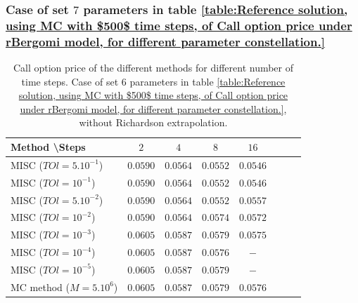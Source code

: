 \documentclass[11pt]{article}
\begin{document}
\subsubsection{Case of set $7$ parameters in table \ref{table:Reference solution, using MC with $500$ time steps, of Call option price under rBergomi model, for different parameter constellation.}}\label{sec:Case of set 7 parameters}

\begin{table}[h!]
	\centering
	\begin{tabular}{l*{6}{c}r}
		Method \textbackslash  Steps            & $2$ & $4$ & $8$ & $16$ &   \\
		\hline
		MISC ($TOl=5.10^{-1}$)  & $0.0590$ & $0.0564$ & $0.0552$ & $0.0546$  \\
		MISC ($TOl=10^{-1}$)  & $0.0590$ &$0.0564$& $0.0552$ & $0.0546$   \\
		MISC ($TOl=5.10^{-2}$)  &$0.0590$ & $0.0564$ & $0.0552$ & $0.0557$  \\
		MISC ($TOl=10^{-2}$)  &$0.0590$ &$0.0564$ & $0.0574$ & $0.0572$  \\
		
		MISC ($TOl=10^{-3}$)  & $0.0605$ & $0.0587$ & $0.0579$ & $0.0575$  \\
		MISC ($TOl=10^{-4}$)  &  $0.0605$ & $0.0587$ & $0.0576$ & $-$  \\
		
		MISC ($TOl=10^{-5}$)  & $0.0605$ & $0.0587$ &  $0.0579$ & $-$  \\
		\hline
		MC method ($M=5.10^{6}$)   & $0.0605$ & $0.0587$  & $0.0579$ & $0.0576$ \\		
		
		\hline
	\end{tabular}
	\caption{ Call option price of the different methods for different number of time steps. Case of set $6$ parameters in table \ref{table:Reference solution, using MC with $500$ time steps, of Call option price under rBergomi model, for different parameter constellation.}, without Richardson extrapolation.}
	\label{table: Call option price of the different methods for different number of time steps. Case set 7}
\end{table}
\end{document}
